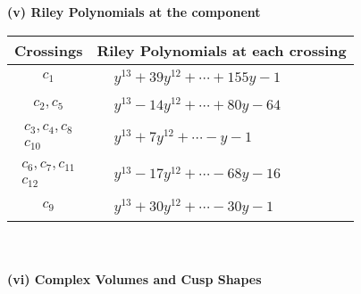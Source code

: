\documentclass[1p]{elsarticle_modified}
\theoremstyle{definition}
\begin{document}
\newpage\renewcommand{\arraystretch}{1}
\flushleft \textbf{(v) Riley Polynomials at the component}\newline \\
\begin{tabular}{m{50pt}|m{274pt}}
Crossings & \hspace{64pt}Riley Polynomials at each crossing \\
\hline $$\begin{aligned}c_{1}\end{aligned}$$&$\begin{aligned}
&y^{13}+39 y^{12}+\cdots+155 y-1
\end{aligned}$\\
\hline $$\begin{aligned}c_{2},c_{5}\end{aligned}$$&$\begin{aligned}
&y^{13}-14 y^{12}+\cdots+80 y-64
\end{aligned}$\\
\hline $$\begin{aligned}c_{3},c_{4},c_{8}\\c_{10}\end{aligned}$$&$\begin{aligned}
&y^{13}+7 y^{12}+\cdots- y-1
\end{aligned}$\\
\hline $$\begin{aligned}c_{6},c_{7},c_{11}\\c_{12}\end{aligned}$$&$\begin{aligned}
&y^{13}-17 y^{12}+\cdots-68 y-16
\end{aligned}$\\
\hline $$\begin{aligned}c_{9}\end{aligned}$$&$\begin{aligned}
&y^{13}+30 y^{12}+\cdots-30 y-1
\end{aligned}$\\
\hline
\end{tabular}\\~\\
\newpage\flushleft \textbf{(vi) Complex Volumes and Cusp Shapes}
\end{document}
